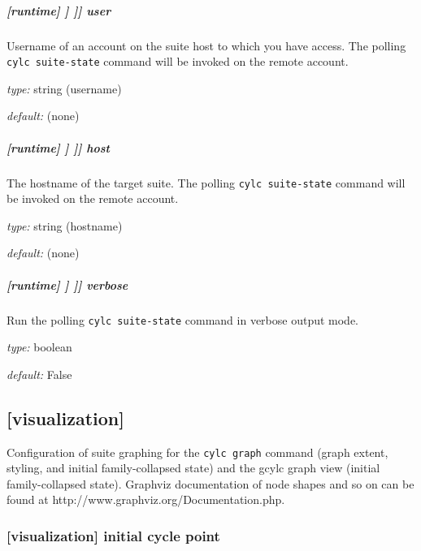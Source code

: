 \subparagraph[user]{[runtime] \textrightarrow [[\_\_NAME\_\_]] \textrightarrow [[[suite state polling]]] \textrightarrow user}

Username of an account on the suite host to which you have access. The
polling \lstinline=cylc suite-state= command will be invoked
on the remote account.

\begin{myitemize}
    \item {\em type:} string (username)
    \item {\em default:} (none)
\end{myitemize}

\subparagraph[host]{[runtime] \textrightarrow [[\_\_NAME\_\_]] \textrightarrow [[[suite state polling]]] \textrightarrow host}

The hostname of the target suite. The polling \lstinline=cylc suite-state= command
will be invoked on the remote account.

\begin{myitemize}
    \item {\em type:} string (hostname)
    \item {\em default:} (none)
\end{myitemize}

\subparagraph[verbose]{[runtime] \textrightarrow [[\_\_NAME\_\_]] \textrightarrow [[[suite state polling]]] \textrightarrow verbose}

Run the polling \lstinline=cylc suite-state= command in verbose output mode.

\begin{myitemize}
    \item {\em type:} boolean
    \item {\em default:} False
\end{myitemize}

\subsection{[visualization]}

Configuration of suite graphing for the \lstinline=cylc graph= command (graph
extent, styling, and initial family-collapsed state) and the gcylc graph view
(initial family-collapsed state). Graphviz documentation of node shapes
and so on can be found at http://www.graphviz.org/Documentation.php.

\subsubsection[initial cycle point]{[visualization] \textrightarrow initial cycle point}

